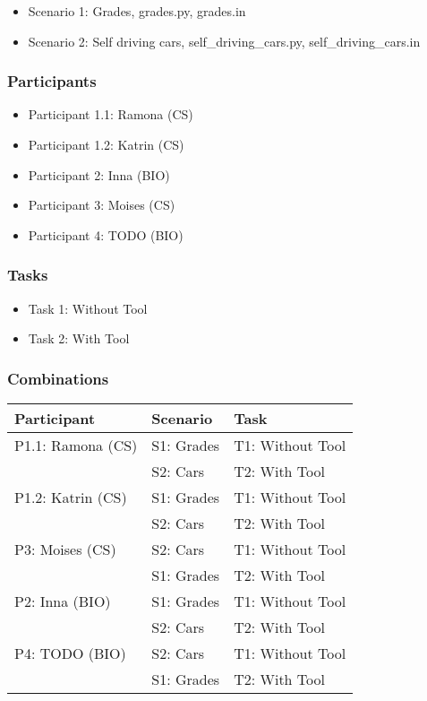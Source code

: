 \documentclass[11pt]{article}
\begin{document}
\begin{itemize}
    \item Scenario 1: Grades, grades.py, grades.in
    \item Scenario 2: Self driving cars, self\_driving\_cars.py, self\_driving\_cars.in
\end{itemize}

\subsubsection{Participants}

\begin{itemize}
    \item Participant 1.1: Ramona (CS)
    \item Participant 1.2: Katrin (CS)
    \item Participant 2: Inna (BIO)
    \item Participant 3: Moises (CS)
    \item Participant 4: TODO (BIO)
\end{itemize}

\subsubsection{Tasks}

\begin{itemize}
    \item Task 1: Without Tool
    \item Task 2: With Tool
\end{itemize}

\subsubsection{Combinations}

\begin{tabular}{ |l|l|l| }
\hline
Participant & Scenario & Task \\
\hline
P1.1: Ramona (CS) & S1: Grades & T1: Without Tool \\
\hline
& S2: Cars & T2: With Tool \\
\hline
P1.2: Katrin (CS) & S1: Grades & T1: Without Tool \\
\hline
& S2: Cars & T2: With Tool \\
\hline
P3: Moises (CS) & S2: Cars & T1: Without Tool \\
\hline
& S1: Grades & T2: With Tool \\
\hline
P2: Inna (BIO) & S1: Grades & T1: Without Tool \\
\hline
& S2: Cars & T2: With Tool \\
\hline
P4: TODO (BIO) & S2: Cars & T1: Without Tool \\
\hline
& S1: Grades & T2: With Tool \\
\hline
\end{tabular}
\end{document}
